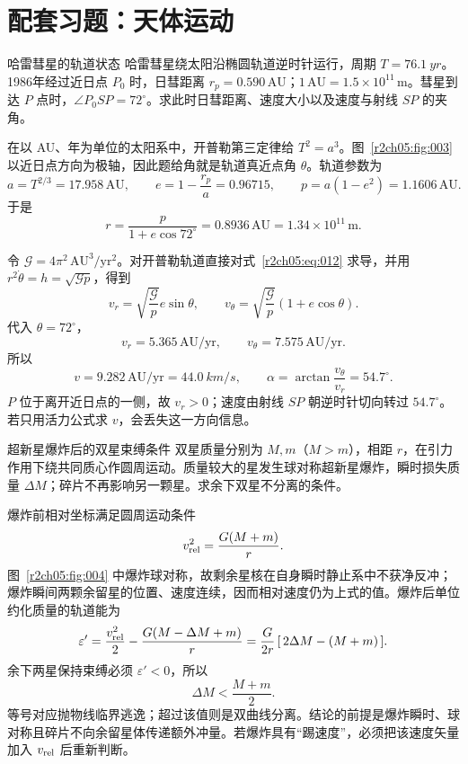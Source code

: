 \clearpage
\section{配套习题：天体运动}
\label{r2ch05:sec:practice}

\begin{practicebox}{哈雷彗星的轨道状态}
哈雷彗星绕太阳沿椭圆轨道逆时针运行，周期 $T=\SI{76.1}{yr}$。1986年经过近日点 $P_0$ 时，日彗距离 $r_p=0.590\,\mathrm{AU}$；$1\,\mathrm{AU}=1.5\times10^{11}\,\mathrm m$。彗星到达 $P$ 点时，$\angle P_0SP=72^\circ$。求此时日彗距离、速度大小以及速度与射线 $SP$ 的夹角。
\label{r2ch05:pr:001}
\begin{solution}
在以 AU、年为单位的太阳系中，开普勒第三定律给 $T^2=a^3$。图~\ref{r2ch05:fig:003} 以近日点方向为极轴，因此题给角就是轨道真近点角 $\theta$。轨道参数为
\begin{equation}
 a=T^{2/3}=17.958\,\mathrm{AU},\qquad
 e=1-\frac{r_p}{a}=0.96715,\qquad
 p=a(1-e^2)=1.1606\,\mathrm{AU}.
 \label{r2ch05:eq:015}
\end{equation}
于是
\[
 \boxed{r=\frac{p}{1+e\cos72^\circ}=0.8936\,\mathrm{AU}
 =1.34\times10^{11}\,\mathrm m}.
\]

令 $\mathcal G=4\pi^2\,\mathrm{AU^3/yr^2}$。对开普勒轨道直接对式~\eqref{r2ch05:eq:012} 求导，并用 $r^2\dot\theta=h=\sqrt{\mathcal Gp}$，得到
\begin{equation}
 v_r=\sqrt{\frac{\mathcal G}{p}}e\sin\theta,\qquad
 v_\theta=\sqrt{\frac{\mathcal G}{p}}(1+e\cos\theta).
 \label{r2ch05:eq:016}
\end{equation}
代入 $\theta=72^\circ$，
\[
 v_r=5.365\,\mathrm{AU/yr},\qquad
 v_\theta=7.575\,\mathrm{AU/yr}.
\]
所以
\[
 \boxed{v=9.282\,\mathrm{AU/yr}=\SI{44.0}{km/s}},\qquad
 \boxed{\alpha=\arctan\frac{v_\theta}{v_r}=54.7^\circ}.
\]
$P$ 位于离开近日点的一侧，故 $v_r>0$；速度由射线 $SP$ 朝逆时针切向转过 $54.7^\circ$。若只用活力公式求 $v$，会丢失这一方向信息。
\figHalleyOrbit
\end{solution}
\end{practicebox}

\begin{practicebox}{超新星爆炸后的双星束缚条件}
双星质量分别为 $M,m$（$M>m$），相距 $r$，在引力作用下绕共同质心作圆周运动。质量较大的星发生球对称超新星爆炸，瞬时损失质量 $\Delta M$；碎片不再影响另一颗星。求余下双星不分离的条件。
\label{r2ch05:pr:002}
\begin{solution}
爆炸前相对坐标满足圆周运动条件
\[
 v_{\rm rel}^2=\frac{G(M+m)}r.
\]
图~\ref{r2ch05:fig:004} 中爆炸球对称，故剩余星核在自身瞬时静止系中不获净反冲；爆炸瞬间两颗余留星的位置、速度连续，因而相对速度仍为上式的值。爆炸后单位约化质量的轨道能为
\begin{equation}
 \varepsilon'=\frac{v_{\rm rel}^2}{2}-\frac{G(M-\Delta M+m)}r
 =\frac{G}{2r}\,[\,2\Delta M-(M+m)\,].
 \label{r2ch05:eq:017}
\end{equation}
余下两星保持束缚必须 $\varepsilon'<0$，所以
\[
 \boxed{\Delta M<\frac{M+m}{2}}.
\]
等号对应抛物线临界逃逸；超过该值则是双曲线分离。结论的前提是爆炸瞬时、球对称且碎片不向余留星体传递额外冲量。若爆炸具有“踢速度”，必须把该速度矢量加入 $v_{\rm rel}$ 后重新判断。
\figBinaryMassLoss
\end{solution}
\end{practicebox}

